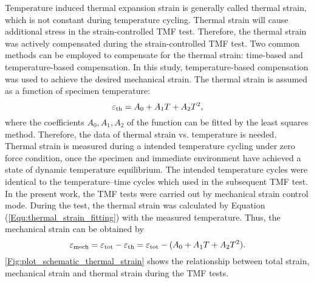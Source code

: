 Temperature induced thermal expansion strain is generally called thermal strain, which is not constant during temperature cycling. Thermal strain will cause additional stress in the strain-controlled TMF test. Therefore, the thermal strain was actively compensated during the strain-controlled TMF test. Two common methods can be employed to compensate for the thermal strain: time-based and temperature-based compensation. In this study, temperature-based compensation was used to achieve the desired mechanical strain. The thermal strain is assumed as a function of specimen temperature:
\begin{equation}
\varepsilon_{\rm{th}}=A_0+A_1 T+A_2 T^2,
\label{Equ:thermal_strain_fitting}
\end{equation}
where the coefficients $A_0,A_1,A_2$ of the function can be fitted by the least squares method. Therefore, the data of thermal strain vs. temperature is needed. Thermal strain is measured during a intended temperature cycling under zero force condition, once the specimen and immediate environment have achieved a state of dynamic temperature equilibrium. The intended temperature cycles were identical to the temperature–time cycles which used in the subsequent TMF test.
In the present work, the TMF tests were carried out by mechanical strain control mode.
During the test, the thermal strain was calculated by Equation (\ref{Equ:thermal_strain_fitting}) with the measured temperature. Thus, the mechanical strain can be obtained by
\begin{equation}
\varepsilon_{\rm{mech}}=\varepsilon_{\rm{tot}}-\varepsilon_{\rm{th}}=\varepsilon_{\rm{tot}}-(A_0+A_1 T+A_2 T^2).
\label{Equ:mech_strain}
\end{equation}
\ref{Fig:plot_schematic_thermal_strain} shows the relationship between total strain, mechanical strain and thermal strain during the TMF tests.

